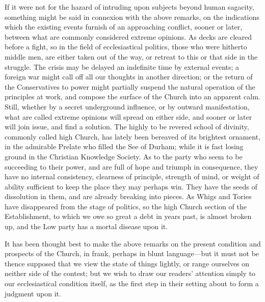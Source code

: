 If it were
not for the hazard of intruding upon subjects beyond human sagacity,
something might be said in connexion with the above remarks, on the
indications which the existing events furnish of an approaching
conflict, sooner or later, between what are commonly considered extreme
opinions. As decks are cleared before a fight, so in the field of
ecclesiastical politics, those who were hitherto middle men, are either
taken out of the way, or retreat to this or that side in the struggle.
The crisis may be delayed an indefinite time by external events; a
foreign war might call off all our thoughts in another direction; or the
return of the Conservatives to power might partially suspend the natural
operation of the principles at work, and compose the surface of the
Church into an apparent calm. Still, whether by a secret underground
influence, or by outward manifestation, what are called extreme opinions
will spread on either side, and sooner or later will join issue, and
find a solution. The highly to be revered school of divinity, commonly
called high Church, has lately been bereaved of its brightest ornament,
in the admirable Prelate who filled the See of Durham; while it is fast
losing ground in the Christian Knowledge Society. As to the party who seem to be succeeding to their power, and are full of hope and
triumph in consequence, they have no internal consistency, clearness of
principle, strength of mind, or weight of ability sufficient to keep the
place they may perhaps win. They have the seeds of dissolution in them,
and are already breaking into pieces. As Whigs and Tories have
disappeared from the stage of politics, so the high Church section of
the Establishment, to which we owe so great a debt in years past, is
almost broken up, and the Low party has a mortal disease upon it.

It has been
thought best to make the above remarks on the present condition and
prospects of the Church, in frank, perhaps in blunt language—but it
must not be thence supposed that we view the state of things lightly, or
range ourselves on neither side of the contest; but we wish to draw our
readers' attention simply to our ecclesiastical condition itself, as
the first step in their setting about to form a judgment upon it.

